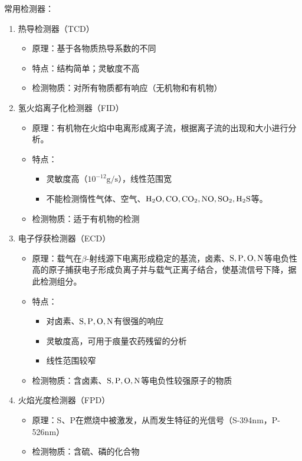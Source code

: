常用检测器：
\begin{enumerate}
	\item 热导检测器（TCD）
	\begin{itemize}
		\item 原理：基于各物质热导系数的不同
		\item 特点：结构简单；灵敏度不高
		\item 检测物质：对所有物质都有响应（无机物和有机物）
	\end{itemize}
	\item 氢火焰离子化检测器（FID）
	\begin{itemize}
		\item 原理：有机物在火焰中电离形成离子流，根据离子流的出现和大小进行分析。
		\item 特点：
		\begin{itemize}
			\item 灵敏度高（$10^{-12}\mathrm{g/s}$），线性范围宽
			\item 不能检测惰性气体、空气、$\ce{H2O,CO,CO2,NO,SO2,H2S}$等。
		\end{itemize}
		\item 检测物质：适于有机物的检测
	\end{itemize}
	\item 电子俘获检测器（ECD）
	\begin{itemize}
		\item 原理：载气在$\beta$-射线源下电离形成稳定的基流，卤素、$\ce{S,P,O,N}$等电负性高的原子捕获电子形成负离子并与载气正离子结合，使基流信号下降，据此检测组分。
		\item 特点：
		\begin{itemize}
			\item 对卤素、$\ce{S,P,O,N}$有很强的响应
			\item 灵敏度高，可用于痕量农药残留的分析
			\item 线性范围较窄
		\end{itemize}
		\item 检测物质：含卤素、$\ce{S,P,O,N}$等电负性较强原子的物质
	\end{itemize}
	\item 火焰光度检测器（FPD）
	\begin{itemize}
		\item 原理：S、P在燃烧中被激发，从而发生特征的光信号（S-394nm，P-526nm）	
		\item 检测物质：含硫、磷的化合物
	\end{itemize}
\end{enumerate}

